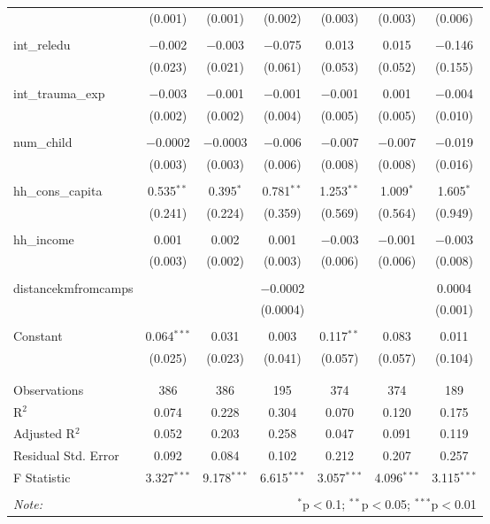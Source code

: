 \begin{table}[H]
\begin{tabular}{@{\extracolsep{4pt}}lcccccc}
  & (0.001) & (0.001) & (0.002) & (0.003) & (0.003) & (0.006) \\ 
  & & & & & & \\ 
 int\_reledu & $-$0.002 & $-$0.003 & $-$0.075 & 0.013 & 0.015 & $-$0.146 \\ 
  & (0.023) & (0.021) & (0.061) & (0.053) & (0.052) & (0.155) \\ 
  & & & & & & \\ 
 int\_trauma\_exp & $-$0.003 & $-$0.001 & $-$0.001 & $-$0.001 & 0.001 & $-$0.004 \\ 
  & (0.002) & (0.002) & (0.004) & (0.005) & (0.005) & (0.010) \\ 
  & & & & & & \\ 
 num\_child & $-$0.0002 & $-$0.0003 & $-$0.006 & $-$0.007 & $-$0.007 & $-$0.019 \\ 
  & (0.003) & (0.003) & (0.006) & (0.008) & (0.008) & (0.016) \\ 
  & & & & & & \\ 
 hh\_cons\_capita & 0.535$^{**}$ & 0.395$^{*}$ & 0.781$^{**}$ & 1.253$^{**}$ & 1.009$^{*}$ & 1.605$^{*}$ \\ 
  & (0.241) & (0.224) & (0.359) & (0.569) & (0.564) & (0.949) \\ 
  & & & & & & \\ 
 hh\_income & 0.001 & 0.002 & 0.001 & $-$0.003 & $-$0.001 & $-$0.003 \\ 
  & (0.003) & (0.002) & (0.003) & (0.006) & (0.006) & (0.008) \\ 
  & & & & & & \\ 
 distancekmfromcamps &  &  & $-$0.0002 &  &  & 0.0004 \\ 
  &  &  & (0.0004) &  &  & (0.001) \\ 
  & & & & & & \\ 
 Constant & 0.064$^{***}$ & 0.031 & 0.003 & 0.117$^{**}$ & 0.083 & 0.011 \\ 
  & (0.025) & (0.023) & (0.041) & (0.057) & (0.057) & (0.104) \\ 
  & & & & & & \\ 
\hline \\[-1.8ex] 
Observations & 386 & 386 & 195 & 374 & 374 & 189 \\ 
R$^{2}$ & 0.074 & 0.228 & 0.304 & 0.070 & 0.120 & 0.175 \\ 
Adjusted R$^{2}$ & 0.052 & 0.203 & 0.258 & 0.047 & 0.091 & 0.119 \\ 
Residual Std. Error & 0.092 & 0.084 & 0.102 & 0.212 & 0.207 & 0.257 \\ 
F Statistic & 3.327$^{***}$ & 9.178$^{***}$ & 6.615$^{***}$ & 3.057$^{***}$ & 4.096$^{***}$ & 3.115$^{***}$ \\ 
\hline 
\hline \\[-1.8ex] 
\textit{Note:}  & \multicolumn{6}{r}{$^{*}$p$<$0.1; $^{**}$p$<$0.05; $^{***}$p$<$0.01} \\ 
\end{tabular} 
\end{table} 
